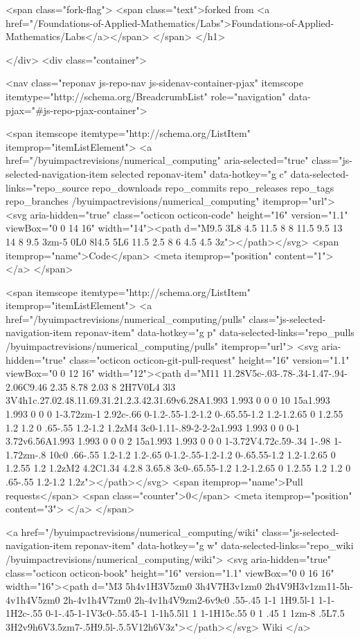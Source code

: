     <span class="fork-flag">
      <span class="text">forked from <a href="/Foundations-of-Applied-Mathematics/Labs">Foundations-of-Applied-Mathematics/Labs</a></span>
    </span>
</h1>

  </div>
  <div class="container">
    
<nav class="reponav js-repo-nav js-sidenav-container-pjax"
     itemscope
     itemtype="http://schema.org/BreadcrumbList"
     role="navigation"
     data-pjax="#js-repo-pjax-container">

  <span itemscope itemtype="http://schema.org/ListItem" itemprop="itemListElement">
    <a href="/byuimpactrevisions/numerical_computing" aria-selected="true" class="js-selected-navigation-item selected reponav-item" data-hotkey="g c" data-selected-links="repo_source repo_downloads repo_commits repo_releases repo_tags repo_branches /byuimpactrevisions/numerical_computing" itemprop="url">
      <svg aria-hidden="true" class="octicon octicon-code" height="16" version="1.1" viewBox="0 0 14 16" width="14"><path d="M9.5 3L8 4.5 11.5 8 8 11.5 9.5 13 14 8 9.5 3zm-5 0L0 8l4.5 5L6 11.5 2.5 8 6 4.5 4.5 3z"></path></svg>
      <span itemprop="name">Code</span>
      <meta itemprop="position" content="1">
</a>  </span>


  <span itemscope itemtype="http://schema.org/ListItem" itemprop="itemListElement">
    <a href="/byuimpactrevisions/numerical_computing/pulls" class="js-selected-navigation-item reponav-item" data-hotkey="g p" data-selected-links="repo_pulls /byuimpactrevisions/numerical_computing/pulls" itemprop="url">
      <svg aria-hidden="true" class="octicon octicon-git-pull-request" height="16" version="1.1" viewBox="0 0 12 16" width="12"><path d="M11 11.28V5c-.03-.78-.34-1.47-.94-2.06C9.46 2.35 8.78 2.03 8 2H7V0L4 3l3 3V4h1c.27.02.48.11.69.31.21.2.3.42.31.69v6.28A1.993 1.993 0 0 0 10 15a1.993 1.993 0 0 0 1-3.72zm-1 2.92c-.66 0-1.2-.55-1.2-1.2 0-.65.55-1.2 1.2-1.2.65 0 1.2.55 1.2 1.2 0 .65-.55 1.2-1.2 1.2zM4 3c0-1.11-.89-2-2-2a1.993 1.993 0 0 0-1 3.72v6.56A1.993 1.993 0 0 0 2 15a1.993 1.993 0 0 0 1-3.72V4.72c.59-.34 1-.98 1-1.72zm-.8 10c0 .66-.55 1.2-1.2 1.2-.65 0-1.2-.55-1.2-1.2 0-.65.55-1.2 1.2-1.2.65 0 1.2.55 1.2 1.2zM2 4.2C1.34 4.2.8 3.65.8 3c0-.65.55-1.2 1.2-1.2.65 0 1.2.55 1.2 1.2 0 .65-.55 1.2-1.2 1.2z"></path></svg>
      <span itemprop="name">Pull requests</span>
      <span class="counter">0</span>
      <meta itemprop="position" content="3">
</a>  </span>

    <a href="/byuimpactrevisions/numerical_computing/wiki" class="js-selected-navigation-item reponav-item" data-hotkey="g w" data-selected-links="repo_wiki /byuimpactrevisions/numerical_computing/wiki">
      <svg aria-hidden="true" class="octicon octicon-book" height="16" version="1.1" viewBox="0 0 16 16" width="16"><path d="M3 5h4v1H3V5zm0 3h4V7H3v1zm0 2h4V9H3v1zm11-5h-4v1h4V5zm0 2h-4v1h4V7zm0 2h-4v1h4V9zm2-6v9c0 .55-.45 1-1 1H9.5l-1 1-1-1H2c-.55 0-1-.45-1-1V3c0-.55.45-1 1-1h5.5l1 1 1-1H15c.55 0 1 .45 1 1zm-8 .5L7.5 3H2v9h6V3.5zm7-.5H9.5l-.5.5V12h6V3z"></path></svg>
      Wiki
</a>

